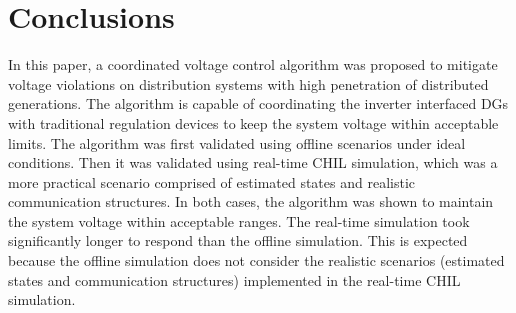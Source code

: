 \documentclass[Journal]{IEEEtran}
\begin{document}
\section{Conclusions}
In this paper, a coordinated voltage control algorithm was proposed to mitigate voltage violations on distribution systems with high penetration of distributed generations. The algorithm is capable of coordinating the inverter interfaced DGs with traditional regulation devices to keep the system voltage within acceptable limits. The algorithm was first validated using offline scenarios under ideal conditions. Then it was validated using real-time CHIL simulation, which was a more practical scenario comprised of estimated states and realistic communication structures. In both cases, the algorithm was shown to maintain the system voltage within acceptable ranges. The real-time simulation took significantly longer to respond than the offline simulation. This is expected because the offline simulation does not consider the realistic scenarios (estimated states and communication structures) implemented in the real-time CHIL simulation. 



\end{document}
